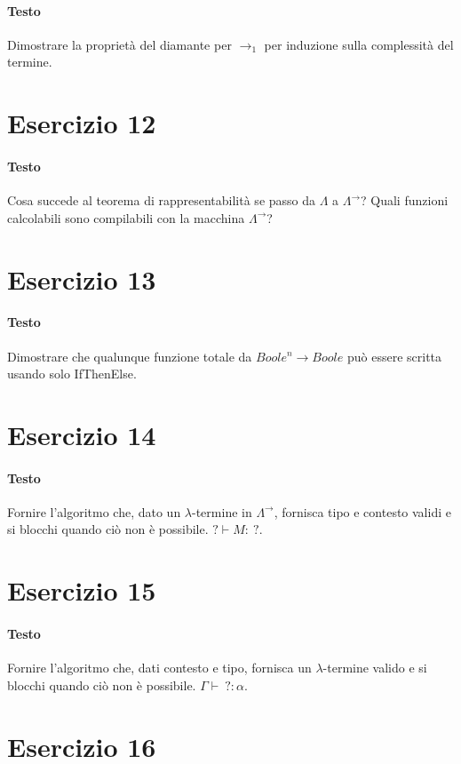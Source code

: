 \documentclass[a4paper,10pt]{article}
\begin{document}
\paragraph{Testo}
Dimostrare la proprietà del diamante per $\rightarrow_1$ per induzione sulla complessità del termine.

\section*{Esercizio 12}
\paragraph{Testo}
Cosa succede al teorema di rappresentabilità se passo da $\Lambda$ a $\Lambda^\rightarrow$? Quali funzioni calcolabili sono compilabili con la macchina $\Lambda^\rightarrow$?

\section*{Esercizio 13}
\paragraph{Testo}
Dimostrare che qualunque funzione totale da $Boole^n \rightarrow Boole$ può essere scritta usando solo IfThenElse.

\section*{Esercizio 14}
\paragraph{Testo}
Fornire l’algoritmo che, dato un $\lambda$-termine in $\Lambda^\rightarrow$, fornisca tipo e contesto validi e si blocchi quando ciò non è possibile. $? \vdash M :\: ?$.

\section*{Esercizio 15}
\paragraph{Testo}
Fornire l’algoritmo che, dati contesto e tipo, fornisca un $\lambda$-termine valido e si blocchi quando ciò non è possibile. $\Gamma \vdash \: ? : \alpha$.

\section*{Esercizio 16}
\end{document}
